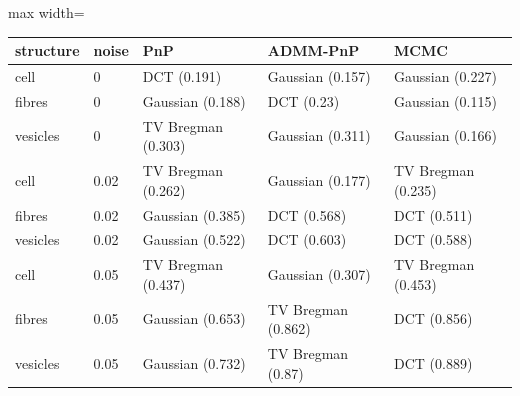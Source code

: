 \begin{center}\begin{adjustbox}{max width=\linewidth}
\begin{tabular}{lllll}
\toprule
structure & noise & PnP & ADMM-PnP & MCMC \\
\midrule
cell & 0 & DCT (0.191) & Gaussian (0.157) & Gaussian (0.227) \\
fibres & 0 & Gaussian (0.188) & DCT (0.23) & Gaussian (0.115) \\
vesicles & 0 & TV Bregman (0.303) & Gaussian (0.311) & Gaussian (0.166) \\
cell & 0.02 & TV Bregman (0.262) & Gaussian (0.177) & TV Bregman (0.235) \\
fibres & 0.02 & Gaussian (0.385) & DCT (0.568) & DCT (0.511) \\
vesicles & 0.02 & Gaussian (0.522) & DCT (0.603) & DCT (0.588) \\
cell & 0.05 & TV Bregman (0.437) & Gaussian (0.307) & TV Bregman (0.453) \\
fibres & 0.05 & Gaussian (0.653) & TV Bregman (0.862) & DCT (0.856) \\
vesicles & 0.05 & Gaussian (0.732) & TV Bregman (0.87) & DCT (0.889) \\
\bottomrule
\end{tabular}\end{adjustbox}\end{center}
